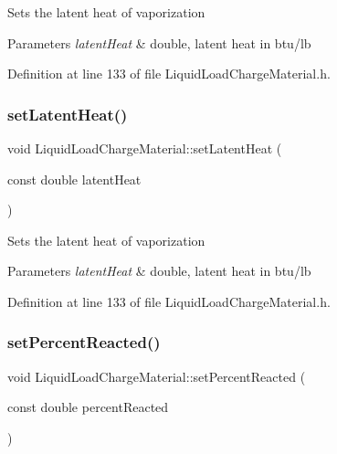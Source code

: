 Sets the latent heat of vaporization 
\begin{DoxyParams}{Parameters}
{\em latent\+Heat} & double, latent heat in btu/lb \\
\hline
\end{DoxyParams}


Definition at line 133 of file Liquid\+Load\+Charge\+Material.\+h.

\mbox{\label{class_liquid_load_charge_material_a01d2d23580f27aa9e5cba1124635a677}} 
\subsubsection{\texorpdfstring{set\+Latent\+Heat()}{setLatentHeat()}\hspace{0.1cm}{\footnotesize\ttfamily [3/3]}}
{\footnotesize\ttfamily void Liquid\+Load\+Charge\+Material\+::set\+Latent\+Heat (\begin{DoxyParamCaption}\item[{const double}]{latent\+Heat }\end{DoxyParamCaption})\hspace{0.3cm}{\ttfamily [inline]}}

Sets the latent heat of vaporization 
\begin{DoxyParams}{Parameters}
{\em latent\+Heat} & double, latent heat in btu/lb \\
\hline
\end{DoxyParams}


Definition at line 133 of file Liquid\+Load\+Charge\+Material.\+h.

\mbox{\label{class_liquid_load_charge_material_a9984b8c78a460ef3569fc3ef13eea604}} 
\subsubsection{\texorpdfstring{set\+Percent\+Reacted()}{setPercentReacted()}\hspace{0.1cm}{\footnotesize\ttfamily [1/3]}}
{\footnotesize\ttfamily void Liquid\+Load\+Charge\+Material\+::set\+Percent\+Reacted (\begin{DoxyParamCaption}\item[{const double}]{percent\+Reacted }\end{DoxyParamCaption})\hspace{0.3cm}{\ttfamily [inline]}}

